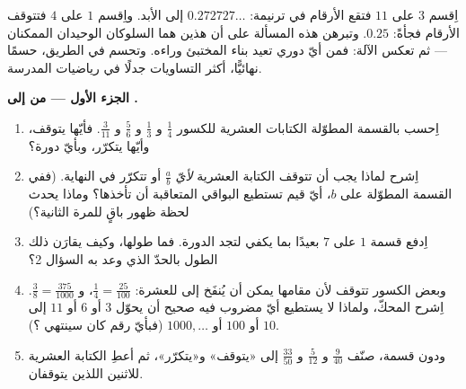 \begin{problem}
\label{pb:g9:fractions:1}
اِقسم $3$ على $11$ فتقع الأرقام في ترنيمة:
$0.272727\ldots$ إلى الأبد. واِقسم $1$ على $4$ فتتوقف الأرقام
فجأةً: $0.25$. وتبرهن هذه المسألة على أن هذين هما السلوكان
الوحيدان الممكنان  --- ثم تعكس الآلة:
فمن أيّ  دوري تعيد بناء 
المختبئ وراءه. وتحسم في الطريق، حسمًا نهائيًّا،
أكثر التساويات جدلًا في رياضيات المدرسة.

\medskip
\noindent\textbf{الجزء الأول --- من  إلى .}
\begin{enumerate}
  \item اِحسب بالقسمة المطوّلة الكتابات العشرية للكسور
        $\frac14$ و $\frac13$ و $\frac56$ و $\frac{3}{11}$.
        فأيّها يتوقف، وأيّها يتكرّر، وبأيّ دورة؟
  \item اِشرح لماذا يجب أن تتوقف الكتابة العشرية \emph{لأيّ} 
        $\frac ab$ أو تتكرّر في النهاية. (ففي القسمة
        المطوّلة على $b$، أيّ قيم تستطيع البواقي
        المتعاقبة أن تأخذها؟ وماذا يحدث لحظة ظهور باقٍ
        للمرة الثانية؟)
  \item اِدفع قسمة $1$ على $7$ بعيدًا بما يكفي لتجد
        الدورة. فما طولها، وكيف يقارَن ذلك الطول
        بالحدّ الذي وعد به السؤال 2؟
  \item وبعض الكسور تتوقف لأن مقامها يمكن أن
        يُنفَخ إلى  للعشرة: $\frac14 =
        \frac{25}{100}$، و $\frac{3}{8} = \frac{375}{1000}$.
        اِشرح المحكّ، ولماذا لا يستطيع أيّ مضروب فيه صحيح
        أن يحوّل $3$ أو $6$ أو $11$ إلى $10$ أو $100$
        أو $1000, \dots$ (فبأيّ رقم كان سينتهي ؟).
  \item ودون قسمة، صنّف $\frac{9}{40}$ و $\frac{5}{12}$ و
        $\frac{33}{50}$ إلى «يتوقف» و«يتكرّر»، ثم أعطِ
        الكتابة العشرية للاثنين اللذين يتوقفان.
\end{enumerate}


\end{problem}
